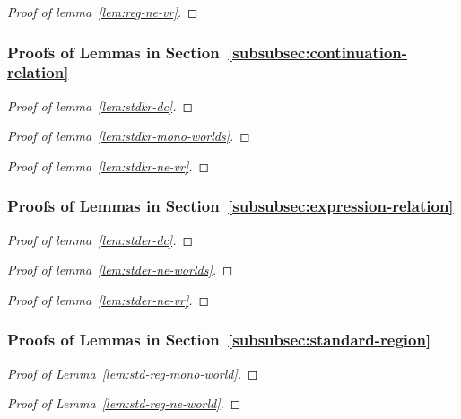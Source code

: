 \documentclass[a4paper]{article}
\begin{document}
\begin{appendices}
\begin{proof}[Proof of lemma~\ref{lem:reg-ne-vr}]
\end{proof}

\subsubsection{Proofs of Lemmas in Section~\ref{subsubsec:continuation-relation}}
\begin{proof}[Proof of lemma~\ref{lem:stdkr-dc}]
\end{proof}

\begin{proof}[Proof of lemma~\ref{lem:stdkr-mono-worlds}]
\end{proof}

\begin{proof}[Proof of lemma~\ref{lem:stdkr-ne-vr}]
\end{proof}

\subsubsection{Proofs of Lemmas in Section~\ref{subsubsec:expression-relation}}
\begin{proof}[Proof of lemma~\ref{lem:stder-dc}]
\end{proof}

\begin{proof}[Proof of lemma~\ref{lem:stder-ne-worlds}]
\end{proof}

\begin{proof}[Proof of lemma~\ref{lem:stder-ne-vr}]
\end{proof}

\subsubsection{Proofs of Lemmas in Section~\ref{subsubsec:standard-region}}
\begin{proof}[Proof of Lemma~\ref{lem:std-reg-mono-world}]
\end{proof}

\begin{proof}[Proof of Lemma~\ref{lem:std-reg-ne-world}]
\end{proof}


\end{appendices}
\end{document}
